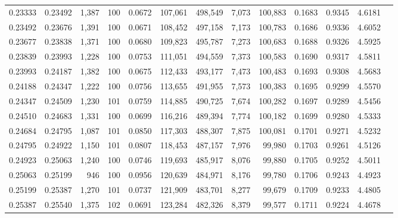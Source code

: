 \begin{tabular}{rrrrrrrrrrrrr}
0.23333 & 0.23492 & 1,387 & 100 &                                     0.0672 & 107,061 & 498,549 &   7,073 & 100,883 & 0.1683 & 0.9345 & 4.6181 \\
0.23492 & 0.23676 & 1,391 & 100 &                                     0.0671 & 108,452 & 497,158 &   7,173 & 100,783 & 0.1686 & 0.9336 & 4.6052 \\
0.23677 & 0.23838 & 1,371 & 100 &                                     0.0680 & 109,823 & 495,787 &   7,273 & 100,683 & 0.1688 & 0.9326 & 4.5925 \\
0.23839 & 0.23993 & 1,228 & 100 &                                     0.0753 & 111,051 & 494,559 &   7,373 & 100,583 & 0.1690 & 0.9317 & 4.5811 \\
0.23993 & 0.24187 & 1,382 & 100 &                                     0.0675 & 112,433 & 493,177 &   7,473 & 100,483 & 0.1693 & 0.9308 & 4.5683 \\
0.24188 & 0.24347 & 1,222 & 100 &                                     0.0756 & 113,655 & 491,955 &   7,573 & 100,383 & 0.1695 & 0.9299 & 4.5570 \\
0.24347 & 0.24509 & 1,230 & 101 &                                     0.0759 & 114,885 & 490,725 &   7,674 & 100,282 & 0.1697 & 0.9289 & 4.5456 \\
0.24510 & 0.24683 & 1,331 & 100 &                                     0.0699 & 116,216 & 489,394 &   7,774 & 100,182 & 0.1699 & 0.9280 & 4.5333 \\
0.24684 & 0.24795 & 1,087 & 101 &                                     0.0850 & 117,303 & 488,307 &   7,875 & 100,081 & 0.1701 & 0.9271 & 4.5232 \\
0.24795 & 0.24922 & 1,150 & 101 &                                     0.0807 & 118,453 & 487,157 &   7,976 &  99,980 & 0.1703 & 0.9261 & 4.5126 \\
0.24923 & 0.25063 & 1,240 & 100 &                                     0.0746 & 119,693 & 485,917 &   8,076 &  99,880 & 0.1705 & 0.9252 & 4.5011 \\
0.25063 & 0.25199 &   946 & 100 &                                     0.0956 & 120,639 & 484,971 &   8,176 &  99,780 & 0.1706 & 0.9243 & 4.4923 \\
0.25199 & 0.25387 & 1,270 & 101 &                                     0.0737 & 121,909 & 483,701 &   8,277 &  99,679 & 0.1709 & 0.9233 & 4.4805 \\
0.25387 & 0.25540 & 1,375 & 102 &                                     0.0691 & 123,284 & 482,326 &   8,379 &  99,577 & 0.1711 & 0.9224 & 4.4678 \\

\end{tabular}
